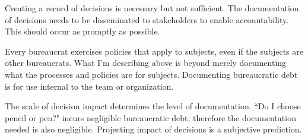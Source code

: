 Creating a record of decisions is necessary but not sufficient. The documentation of decisions needs to be disseminated to stakeholders to enable accountability. This should occur as promptly as possible. 

Every bureaucrat exercises policies that apply to subjects, even if the subjects are other bureaucrats. What I'm describing above is beyond merely documenting what the processes and policies are for subjects. Documenting bureaucratic debt is for use internal to the team or organization.  

The scale of decision impact determines the level of documentation. ``Do I choose pencil or pen?" incurs negligible bureaucratic debt; therefore the documentation needed is also negligible. Projecting impact of decisions is a subjective prediction. 


